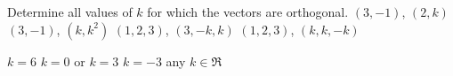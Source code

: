 
\begin{Exercise}[
name={},
title={}, 
difficulty=0,
origin={\cite{SM}}]
Determine all values of $k$ for which the vectors are orthogonal.
\Question $(3,-1)$, $(2,k)$
\Question $(3,-1)$, $(k,k^2)$
\Question $(1,2,3)$, $(3,-k,k)$
\Question $(1,2,3)$, $(k,k,-k)$
\end{Exercise}

\begin{Answer}
\Question $k=6$
\Question $k=0$ or $k=3$
\Question $k=-3$
\Question any $k\in\Re$
\end{Answer}
